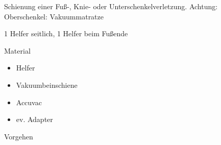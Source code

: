 \documentclass{article}
\begin{document}
{
Schienung einer Fu{\ss}-, Knie- oder Unterschenkelverletzung. Achtung:
Oberschenkel: Vakuummatratze}

{
1 Helfer seitlich, 1 Helfer beim Fu{\ss}ende}

{\mdseries\color{black}
Material}

\begin{itemize}
\item { Helfer}

\item {\mdseries
Vakuumbeinschiene}

\item {\mdseries
Accuvac}

\item {\mdseries
ev. Adapter}

\end{itemize}
{\mdseries\color{black}
Vorgehen}
\end{document}
